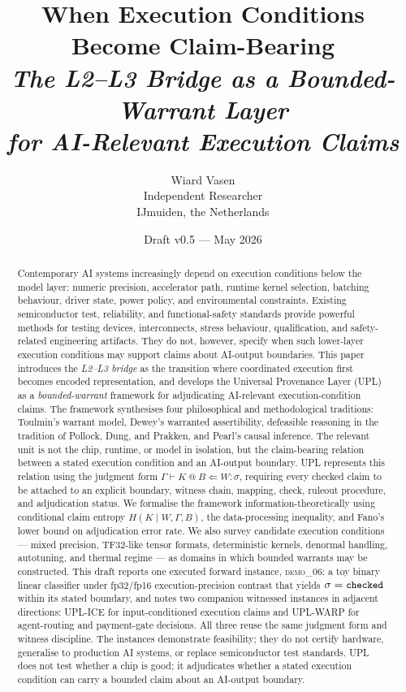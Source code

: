 \documentclass[11pt, a4paper]{article}
\title{When Execution Conditions Become Claim-Bearing\\[6pt]
\large\itshape The L2--L3 Bridge as a Bounded-Warrant Layer\\
for AI-Relevant Execution Claims}
\author{Wiard Vasen\\[2pt]\small\normalfont Independent Researcher\\\small\normalfont IJmuiden, the Netherlands}
\date{\small Draft v0.5 --- May 2026}
\makeatletter
\theoremstyle{upldef}
\newcommand{\upljudge}[4]{\ensuremath{#1 \vdash #2\ @\ #3 \Leftarrow #4 : \sigma}}
\newcommand{\statuslabel}[1]{\texttt{\small #1}}
\makeatother
\begin{document}
\maketitle

\begin{abstract}
\noindent
Contemporary AI systems increasingly depend on execution conditions
below the model layer: numeric precision, accelerator path, runtime
kernel selection, batching behaviour, driver state, power policy,
and environmental constraints. Existing semiconductor test,
reliability, and functional-safety standards provide powerful methods
for testing devices, interconnects, stress behaviour, qualification,
and safety-related engineering artifacts. They do not, however,
specify when such lower-layer execution conditions may support
claims about AI-output boundaries. This paper introduces the
\emph{L2--L3 bridge} as the transition where coordinated execution
first becomes encoded representation, and develops the
Universal Provenance Layer (UPL) as a \emph{bounded-warrant}
framework for adjudicating AI-relevant execution-condition claims.
The framework synthesises four philosophical and methodological
traditions: Toulmin's warrant model, Dewey's warranted assertibility,
defeasible reasoning in the tradition of Pollock, Dung, and Prakken,
and Pearl's causal inference. The relevant unit is not the chip,
runtime, or model in isolation, but the claim-bearing relation
between a stated execution condition and an AI-output boundary.
UPL represents this relation using the judgment form
$\upljudge{\Gamma}{K}{B}{W}$, requiring every checked claim to be
attached to an explicit boundary, witness chain, mapping, check,
ruleout procedure, and adjudication status. We formalise the
framework information-theoretically using conditional claim entropy
$H(K \mid W, \Gamma, B)$, the data-processing inequality, and Fano's
lower bound on adjudication error rate. We also survey candidate
execution conditions --- mixed precision, TF32-like tensor formats,
deterministic kernels, denormal handling, autotuning, and thermal
regime --- as domains in which bounded warrants may be constructed.
This draft reports one executed forward instance, \textsc{demo\_06}:
a toy binary linear classifier under fp32/fp16 execution-precision
contrast that yields $\sigma=\statuslabel{checked}$ within its stated
boundary, and notes two companion witnessed instances in adjacent
directions: UPL-ICE for input-conditioned execution claims and
UPL-WARP for agent-routing and payment-gate decisions. All three
reuse the same judgment form and witness discipline. The instances
demonstrate feasibility; they do not certify hardware, generalise
to production AI systems, or replace semiconductor test standards.
UPL does not test whether a chip is good; it adjudicates whether a
stated execution condition can carry a bounded claim about an
AI-output boundary.
\end{abstract}
\end{document}

